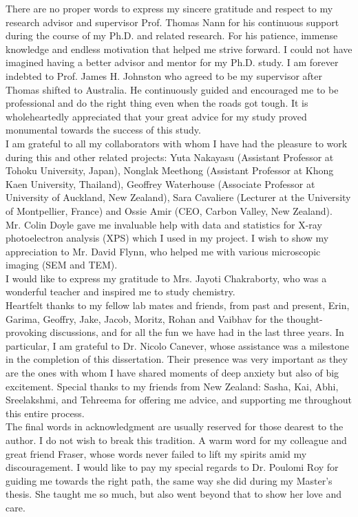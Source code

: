 \documentclass[
11pt, %
oneside, %
english, %
onehalfspacing, %
nolistspacing, %
liststotoc, %
headsepline, %
consistentlayout, %
]{name} %
\begin{document}
\begin{acknowledgements}
\addchaptertocentry{\acknowledgementname} 
There are no proper words to express my sincere gratitude and respect to my research advisor and supervisor Prof. Thomas Nann for his continuous support during the course of my Ph.D. and related research. For his patience, immense knowledge and endless motivation that helped me strive forward. I could not have imagined having a better advisor and mentor for my Ph.D. study.
I am forever indebted to Prof. James H. Johnston who agreed to be my supervisor after Thomas shifted to Australia. He continuously guided and encouraged me to be professional and do the right thing even when the roads got tough. It is wholeheartedly appreciated that your great advice for my study proved monumental towards the success of this study. \\
I am grateful to all my collaborators with whom I have had the pleasure to work during this and other related projects: Yuta Nakayasu (Assistant Professor at Tohoku University, Japan), Nonglak Meethong (Assistant Professor at Khong Kaen University, Thailand), Geoffrey Waterhouse (Associate Professor at University of Auckland, New Zealand), Sara Cavaliere (Lecturer at the University of Montpellier, France) and Ossie Amir (CEO, Carbon Valley, New Zealand). \\
Mr. Colin Doyle gave me invaluable help with data and statistics for X-ray photoelectron analysis (XPS) which I used in my project. I wish to show my appreciation to Mr. David Flynn, who helped me with various microscopic imaging (SEM and TEM). \\
I would like to express my gratitude to Mrs. Jayoti Chakraborty, who was a wonderful teacher and inspired me to study chemistry. \\
Heartfelt thanks to my fellow lab mates and friends, from past and present, Erin, Garima, Geoffry, Jake, Jacob, Moritz, Rohan and Vaibhav for the thought-provoking discussions, and for all the fun we have had in the last three years. In particular, I am grateful to Dr. Nicolo Canever, whose assistance was a milestone in the completion of this dissertation. Their presence was very important as they are the ones with whom I have shared moments of deep anxiety but also of big excitement. Special thanks to my friends from New Zealand: Sasha, Kai, Abhi, Sreelakshmi, and Tehreema for offering me advice, and supporting me throughout this entire process. \\
The final words in acknowledgment are usually reserved for those dearest to the author. I do not wish to break this tradition. A warm word for my colleague and great friend Fraser, whose words never failed to lift my spirits amid my discouragement. I would like to pay my special regards to Dr. Poulomi Roy for guiding me towards the right path, the same way she did during my Master's thesis. She taught me so much, but also went beyond that to show her love and care. \\

\end{acknowledgements}
\end{document}
